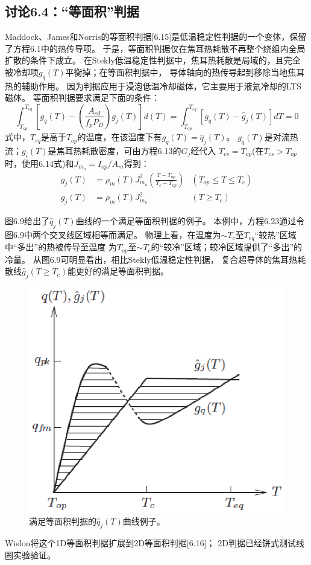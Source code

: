 \subsection{讨论6.4：“等面积”判据}
Maddock、James和Norris的等面积判据[6.15]是低温稳定性判据的一个变体，保留了方程6.1中的热传导项。
于是，等面积判据仅在焦耳热耗散不再整个绕组内全局扩散的条件下成立。
在Stekly低温稳定性判据中，焦耳热耗散是局域的，且完全被冷却项$g_q(T)$平衡掉；在等面积判据中，
导体轴向的热传导起到移除当地焦耳热的辅助作用。
因为判据应用于浸泡低温冷却磁体，它主要用于液氦冷却的LTS磁体。
等面积判据要求满足下面的条件：
\begin{equation}%
\int_{T_{op}}^{T_{eq}}[g_q(T)-(\frac{A_{cd}}{f_pP_D})g_j(T)]d(T)
=\int_{T_{op}}^{T_{eq}}[g_q(T)-\hat{g}_j(T)]dT=0
\end{equation}
式中，$T_{eq}$是高于$T_{op}$的温度，在该温度下有$g_q(T)=\hat{q}_j(T)$。
$g_q(T)$是对流热流；$g_i(T)$是焦耳热耗散密度，可由方程6.13的$G_j$经代入
$T_{cs}=T_{op}$(在$T_{cs}>T_{op}$时，使用6.14式)和$J_{m_o}=I_{op}/A_m$得到：
\begin{subequations}
	\begin{align}
	g_j(T)&=\rho_m(T)J_{m_o}^2(\frac{T-T_{op}}{T_c-T_{op}}) &(T_{op}\leq T \leq T_c)\\
	g_j(T)&=\rho_m(T)J_{m_o}^2 &(T \geq T_c)
	\end{align}
\end{subequations}

图6.9给出了$\hat{q}_j(T)$曲线的一个满足等面积判据的例子。
本例中，方程6.23通过令图6.9中两个交叉线区域相等而满足。
物理上看，在温度为$\sim T_c$至$T_{eq}$“较热”区域中“多出”的热被传导至温度
为$T_{op}$至$\sim T_{c}$的“较冷”区域；较冷区域提供了“多出”的冷量。
从图6.9可明显看出，相比Stekly低温稳定性判据，
复合超导体的焦耳热耗散线$\hat{g}_j(T\ge T_c)$能更好的满足等面积判据。
\begin{figure}[htbp]
	\centering
	\includegraphics[scale=0.6]{chpt6/figs/fig6.9.eps}
	\caption{满足等面积判据的$\hat{q}_j(T)$曲线例子。}
\end{figure}
Wislon将这个1D等面积判据扩展到2D等面积判据[6.16]；
2D判据已经饼式测试线圈实验验证。

